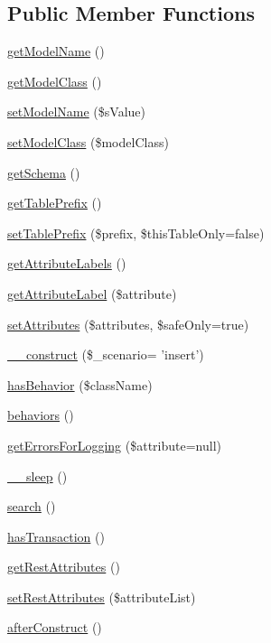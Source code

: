 \subsection*{Public Member Functions}
\begin{DoxyCompactItemize}
\item 
\hyperlink{classCPSModel_a7cd2e13f50fbc61e846e5980f02371f8}{getModelName} ()
\item 
\hyperlink{classCPSModel_aef6109e8c58719533639e6526717fb1b}{getModelClass} ()
\item 
\hyperlink{classCPSModel_a6950c2a0061d704770d6df19daa75606}{setModelName} (\$sValue)
\item 
\hyperlink{classCPSModel_a710a72fc863debf3031e4d423ef9d405}{setModelClass} (\$modelClass)
\item 
\hyperlink{classCPSModel_a41b42bcfd0572f6481a2a323d73c9977}{getSchema} ()
\item 
\hyperlink{classCPSModel_a21e18eb7091f0ae3098c37a4c68fd5dc}{getTablePrefix} ()
\item 
\hyperlink{classCPSModel_a3c04fa5f6105af41bb2f6d1c5b925576}{setTablePrefix} (\$prefix, \$thisTableOnly=false)
\item 
\hyperlink{classCPSModel_a9958a23e416f0e0fd7cc5f3e80532335}{getAttributeLabels} ()
\item 
\hyperlink{classCPSModel_acb1238cae89dbe15864bc28fbfb069a2}{getAttributeLabel} (\$attribute)
\item 
\hyperlink{classCPSModel_a84c15d8a583f4f7f88f683a6db1a567b}{setAttributes} (\$attributes, \$safeOnly=true)
\item 
\hyperlink{classCPSModel_a6e708ea9d538b48ecccffd79e17fb8aa}{\_\-\_\-construct} (\$\_\-scenario= 'insert')
\item 
\hyperlink{classCPSModel_aa5cc1f736392d6a9c6b07db4f06d9f17}{hasBehavior} (\$className)
\item 
\hyperlink{classCPSModel_a211e6bc9ddb71d8c3cdb61d7f92a8331}{behaviors} ()
\item 
\hyperlink{classCPSModel_a4660591fdf032d22bbba3911e2bc5f09}{getErrorsForLogging} (\$attribute=null)
\item 
\hyperlink{classCPSModel_aaf11785905da71774e052912d784e3b4}{\_\-\_\-sleep} ()
\item 
\hyperlink{classCPSModel_a796bf438724e047aeef18579732a3780}{search} ()
\item 
\hyperlink{classCPSModel_abd594bc52ba432da2f83f3e977f4a361}{hasTransaction} ()
\item 
\hyperlink{classCPSModel_a165becb0c2d75653ebcd3064f35addc0}{getRestAttributes} ()
\item 
\hyperlink{classCPSModel_a2c43b5a257f271c45b33f7696ab2baf1}{setRestAttributes} (\$attributeList)
\item 
\hyperlink{classCPSModel_a5c5ebc48ca4a267c9ef1e0e9b4324289}{afterConstruct} ()
\end{DoxyCompactItemize}
